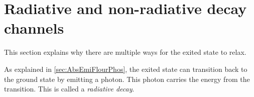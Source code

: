 \section[Decay channels]{Radiative and non-radiative decay channels}
\label{sec:TheoDecayChannels}

This section explains why there are multiple ways for the exited state to relax.

As explained in \cref{sec:AbsEmiFlourPhos}, the exited state can transition back to the ground state by emitting a photon. This 
photon carries the energy from the transition. This is called a \textit{radiative decay}.
